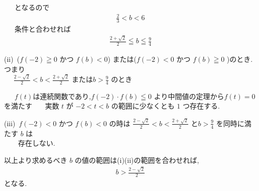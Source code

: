 \documentclass[../main]{subfiles}
\begin{document}
  　~となるので
   \begin{align*}
    \frac{2}{3} < b < 6
  \end{align*}
     　~条件と合わせれば
   \begin{align*}
    \frac{2+\sqrt{2}}{2} \leqq b \leqq \frac{9}{4}
  \end{align*}
  \begin{flushleft} 
     (ii)~($f(-2) \geqq 0$ かつ $f(b) < 0$)
     または($f(-2) < 0$ かつ $f(b) \geqq 0$ )のとき.つまり\\
     　 $\frac{2-\sqrt{2}}{2} < b < \frac{2+\sqrt{2}}{2}$
     または$ b > \frac{9}{4}$ のとき
  \end{flushleft}
  　~$f(t)$は連続関数であり,$f(-2) \cdot f(b) \leqq 0$ より中間値の定理から$f(t) = 0$ を満たす
   　~実数 $t$ が $-2<t<b$ の範囲に少なくとも $1$ つ存在する.
  \begin{flushleft} 
     (iii)~$f(-2) < 0$ かつ $f(b) < 0$ の時は
     $\frac{2-\sqrt{2}}{2} < b < \frac{2+\sqrt{2}}{2}$
     と$ b > \frac{9}{4}$ を同時に満たす $b$ は\\
     　　存在しない.
  \end{flushleft}
  以上より求めるべき $b$ の値の範囲は(i)(ii)の範囲を合わせれば,
  \begin{align*}
    b > \frac{2-\sqrt{2}}{2}
  \end{align*}
  となる.
\end{document}

